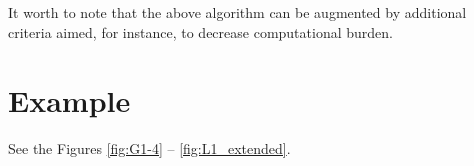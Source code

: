 \documentclass[a4paper, 10pt, conference]{ieeeconf}
\begin{document}
It worth to note that the above algorithm can be augmented by additional
criteria aimed, for instance, to decrease computational burden.




\section{Example}
\label{sec:Example}

See the Figures \ref{fig:G1-4} -- \ref{fig:L1_extended}.
\end{document}

